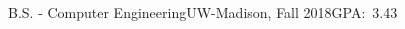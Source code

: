 \documentclass[../main.tex]{subfiles}%
\begin{document}
%
{B.S. - Computer Engineering}{UW-Madison, Fall 2018}{GPA:\ 3.43}
%
{\begin{adjustwidth}{1.2in}{0in}
	\vspace{0.1in}
\end{adjustwidth}}
\end{document}
